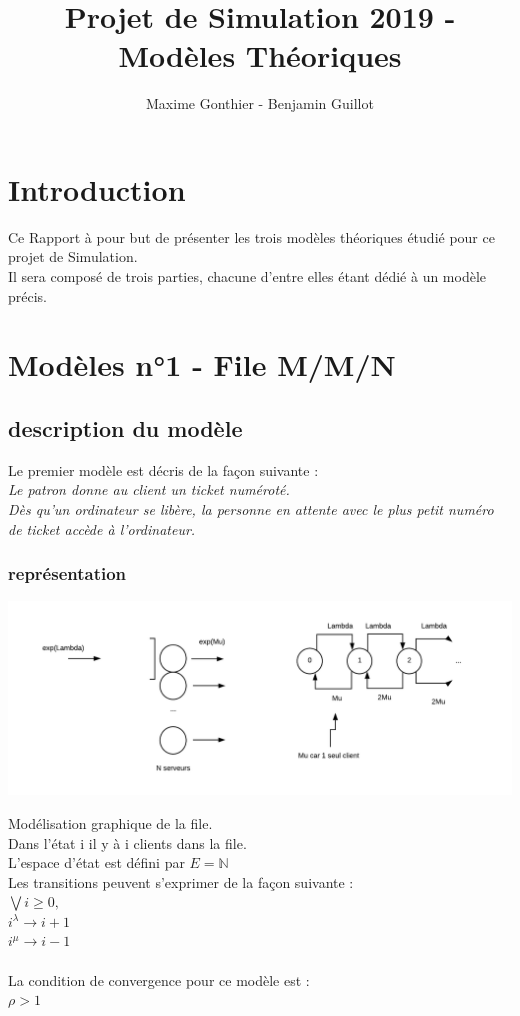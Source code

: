\documentclass[a4paper,11pt]{article}
\title{Projet de Simulation 2019 - Modèles Théoriques}
\author{Maxime Gonthier - Benjamin Guillot}
\begin{document}
\clearpage
\maketitle

\newpage
\tableofcontents

\newpage
\section{Introduction}
	Ce Rapport à pour but de présenter les trois modèles théoriques étudié pour ce projet de Simulation.\\
	Il sera composé de trois parties, chacune d'entre elles étant dédié à un modèle précis.
\section{Modèles n°1 - File M/M/N}
	\subsection{description du modèle}
	Le premier modèle est décris de la façon suivante :\\
	\textit{Le patron donne au client un ticket numéroté.\\
			Dès qu'un ordinateur se libère, la personne en attente avec le plus petit numéro de ticket accède à l'ordinateur.}
		\subsubsection{représentation}
		\centerline{\includegraphics[scale=0.5]{MMN.png}}
		Modélisation graphique de la file.\\
		Dans l'état i il y à i clients dans la file.\\
		L'espace d'état est défini par $E=\pmb{\mathbb{N}}$\\
		Les transitions peuvent s'exprimer de la façon suivante :\\
		$\bigvee i \ge 0,$\\
		$i^{\lambda} \to i + 1 $\\
		$i^{\mu} \to i - 1$\\
		\\
		La condition de convergence pour ce modèle est :\\
		$\rho > 1$
\end{document}
